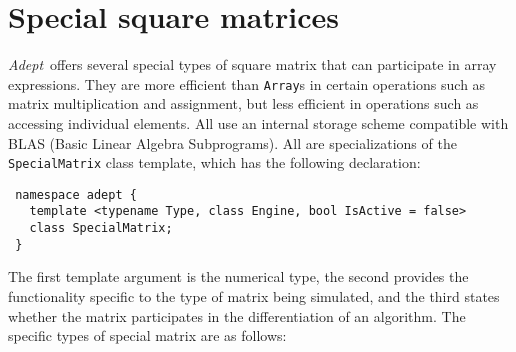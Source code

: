 \documentclass[a4,oneside]{book}
\def\codesize{\small}
\def\Adept{\emph{Adept}}
\def\code#1{{\codesize\texttt{#1}}}
\begin{document}
\section{Special square matrices}
\label{sec:square}
\Adept\ offers several special types of square matrix that can
participate in array expressions.  They are more efficient than
\code{Array}s in certain operations such as matrix multiplication and
assignment, but less efficient in operations such as accessing
individual elements. All use an internal storage scheme compatible
with BLAS (Basic Linear Algebra Subprograms).  All are specializations
of the \code{SpecialMatrix} class template, which has the following
declaration:
\begin{lstlisting}
 namespace adept {
   template <typename Type, class Engine, bool IsActive = false>
   class SpecialMatrix;
 }
\end{lstlisting}
The first template argument is the numerical type, the second provides
the functionality specific to the type of matrix being simulated, and
the third states whether the matrix participates in the
differentiation of an algorithm. The specific types of special matrix
are as follows:
\end{document}
